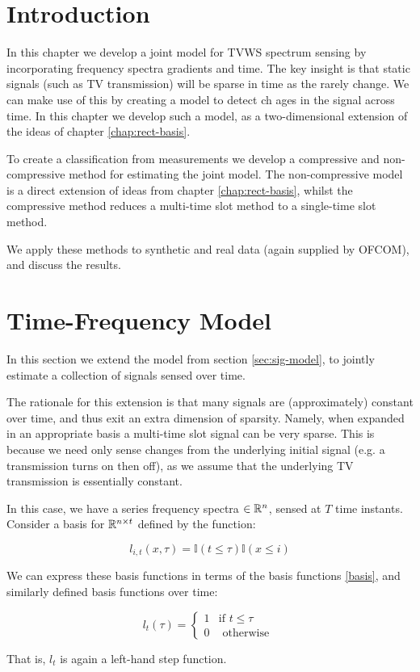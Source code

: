 \section{Introduction}
In this chapter we develop a joint model for TVWS spectrum sensing by incorporating frequency spectra gradients and time. The key insight is that static signals (such as TV transmission) will be sparse in time as the rarely change. We can make use of this by creating a model to detect ch ages in the signal across time. In this chapter we develop such a model, as a two-dimensional extension of the ideas of chapter \ref{chap:rect-basis}. 

To create a classification from measurements we develop a compressive and non-compressive method for estimating the joint model. The non-compressive model is a direct extension of ideas from chapter \ref{chap:rect-basis}, whilst the compressive method reduces a multi-time slot method to a single-time slot method.

We apply these methods to synthetic and real data (again supplied by OFCOM), and discuss the results.

\section{Time-Frequency Model}
In this section we extend the model from section \eqref{sec:sig-model}, to jointly estimate a collection of signals sensed over time. 

The rationale for this extension is that many signals are (approximately) constant over time, and thus exit an extra dimension of sparsity. Namely, when expanded in an appropriate basis a multi-time slot signal can be very sparse. This is because we need only sense changes from the underlying initial signal (e.g. a transmission turns on then off), as we assume that the underlying TV transmission is essentially constant.

In this case, we have a series frequency spectra \(\in {\mathbb{R}}^n\), sensed at \(T\) time instants. Consider a basis for \({\mathbb{R}}^{n\times t}\) defined by the function:

\begin{definition}
\begin{equation}
l_{i,t}\left(x, \tau\right) = \mathbb{I}\left(t \leq \tau \right)\mathbb{I}\left(x \leq i\right)
\label{time-freq basis}
\end{equation}
\end{definition}

\begin{remark}
We can express these basis functions in terms of the basis functions \eqref{basis}, and similarly defined basis functions over time:

\begin{equation}
l_t\left(\tau\right) =
\begin{cases}
1 & \text{if } t \leq \tau \\
0 & \text{ otherwise } 
\end{cases}
\label{time-basis}
\end{equation}

That is, \(l_t\) is again a left-hand step function. 
\end{remark}

